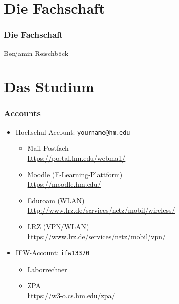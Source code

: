 \documentclass{beamer}
\begin{document}
\section{Die Fachschaft}
\begin{frame}
\frametitle{Die Fachschaft}

\begin{center}
Benjamin Reischböck

\end{center}
\end{frame}


\section{Das Studium}
\begin{frame}
\frametitle{Accounts}

\begin{itemize}
	\item Hochschul-Account: \texttt{yourname@hm.edu}
		\begin{itemize}
			\item Mail-Postfach\\
				\footnotesize\url{https://portal.hm.edu/webmail/}\small
			\pause
			\item Moodle (E-Learning-Plattform)\\
				\footnotesize\url{https://moodle.hm.edu/}\small
			\pause
			\item Eduroam (WLAN)\\
				\footnotesize\url{http://www.lrz.de/services/netz/mobil/wireless/}\small
			\pause
			\item LRZ (VPN/WLAN)\\
				\footnotesize\url{https://www.lrz.de/services/netz/mobil/vpn/}\small
		\end{itemize}
	\pause
	\item IFW-Account: \texttt{ifw13370}
		\begin{itemize}
			\item Laborrechner
			\pause
			\item ZPA\\
				\footnotesize\url{https://w3-o.cs.hm.edu/zpa/}\small
		\end{itemize}
\end{itemize}
\end{frame}
\end{document}
